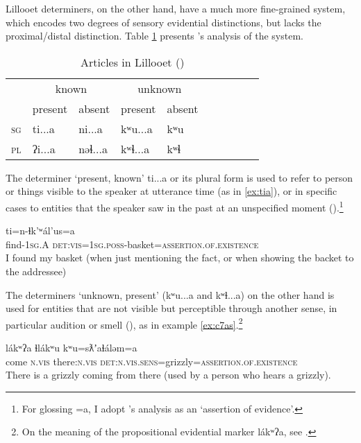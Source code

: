 \documentclass[oneside,a4paper,11pt]{article}
\newcommand{\ipa}[1]{{\phon \mbox{#1}}} %
\begin{document}
Lillooet determiners, on the other hand, have a much more fine-grained system, which encodes two degrees of sensory  evidential distinctions, but lacks the proximal/distal distinction. Table \ref{tab:statimcets.det}  presents \citet{eijk97lillooet}'s analysis of the system. 

 \begin{table}[H]
\caption{Articles in Lillooet (\citealt[192]{eijk97lillooet})} \label{tab:statimcets.det} \centering 
\begin{tabular}{l|lllllllll}
\toprule
& \multicolumn{2}{c}{known} &\multicolumn{2}{c}{unknown} \\
& present & absent & present & absent \\
\midrule
\textsc{sg} & \ipa{ti...a} & \ipa{ni...a} & \ipa{kʷu...a} &\ipa{kʷu} \\
\textsc{pl} &  \ipa{ʔi...a} & \ipa{nəɬ...a} & \ipa{kʷɬ...a} &\ipa{kʷɬ} \\
\bottomrule
\end{tabular}
\end{table}
 
 The determiner `present, known' \ipa{ti...a} or its plural form is used to refer to person or things visible to the speaker at utterance time (as in \ref{ex:tia}), or in specific cases to entities that the speaker saw in the past at an unspecified moment (\citealt[193]{eijk97lillooet}).\footnote{For glossing \ipa{=a}, I adopt \citet{matthewson98determiners}'s analysis as an `assertion of evidence'. }
 
\begin{exe}
\ex \label{ex:tia}
\gll \ipa{pún-ɬkan} 	\ipa{ti=n-ɬk'ʷál'us=a} \\
find-\textsc{1sg.A} \textsc{det:vis=1sg.poss}-basket=\textsc{assertion.of.existence} \\
\glt I found my basket (when just mentioning the fact, or when showing the backet to the addressee)
\end{exe}

The determiners `unknown, present' (\ipa{kʷu...a} and \ipa{kʷɬ...a}) on the other hand is used for entities that are not visible but perceptible through another sense, in particular audition or smell (\citealt[195]{eijk97lillooet}), as in example \ref{ex:c7as}.\footnote{On the meaning of the propositional evidential marker \ipa{lákʷʔa}, see \citet{matthewson10lakw7a}.}

\begin{exe}
\ex \label{ex:c7as}
\gll \ipa{cʔas} 	\ipa{lákʷʔa} 	\ipa{ɬlákʷu} 	\ipa{kʷu=sƛʼaɬáləm=a} \\
 come \textsc{n.vis} there:\textsc{n.vis} \textsc{det:n.vis.sens}=grizzly=\textsc{assertion.of.existence} \\
\glt There is a grizzly coming from there (used by a person who hears a grizzly).
\end{exe}
\end{document}
